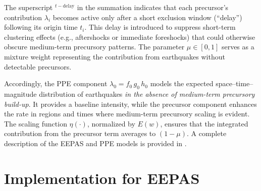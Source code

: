 \documentclass[extra,mreferee]{gji}
\theoremstyle{lemma}
\begin{document}
The superscript ${}^{t - \mathrm{delay}}$ in the summation indicates that each precursor’s contribution $\lambda_i$ becomes active only after a short exclusion window (“delay”) following its origin time $t_i$. This delay is introduced to suppress short-term clustering effects (e.g., aftershocks or immediate foreshocks) that could otherwise obscure medium-term precursory patterns. The parameter $\mu \in [0,1]$ serves as a mixture weight representing the contribution from earthquakes without detectable precursors.

Accordingly, the PPE component $\lambda_0 = f_0\,g_0\,h_0$ models the expected space–time–magnitude distribution of earthquakes \emph{in the absence of medium-term precursory build-up}. It provides a baseline intensity, while the precursor component enhances the rate in regions and times where medium-term precursory scaling is evident. The scaling function $\eta(\cdot)$, normalized by $E(w)$, ensures that the integrated contribution from the precursor term averages to $(1 - \mu)$. A complete description of the EEPAS and PPE models is provided in .


\section{Implementation for EEPAS}\label{sec:implementation}



\end{document}
